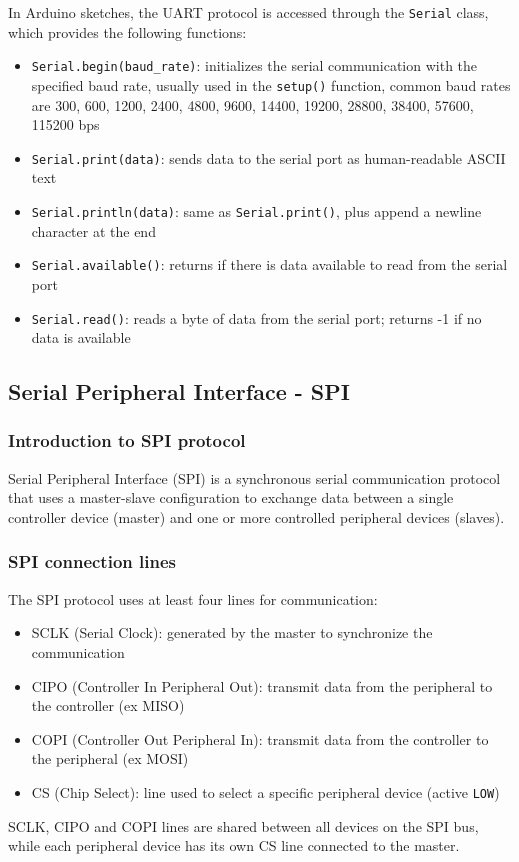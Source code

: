 In Arduino sketches, the UART protocol is accessed through the \texttt{Serial} class, which provides the following functions:
\begin{itemize}
	\item \texttt{Serial.begin(baud\_rate)}: initializes the serial communication with the specified baud rate, usually used
	in the \texttt{setup()} function, common baud rates are 300, 600, 1200, 2400, 4800, 9600, 14400, 19200, 28800, 38400, 57600,
	115200 bps 
	\item \texttt{Serial.print(data)}: sends data to the serial port as human-readable ASCII text
	\item \texttt{Serial.println(data)}: same as \texttt{Serial.print()}, plus append a newline character at the end
	\item \texttt{Serial.available()}: returns if there is data available to read from the serial port
	\item \texttt{Serial.read()}: reads a byte of data from the serial port; returns -1 if no data is available
\end{itemize}

\newpage

\subsection{Serial Peripheral Interface - SPI}
\subsubsection*{Introduction to SPI protocol}
Serial Peripheral Interface (SPI) is a synchronous serial communication protocol that uses a master-slave configuration
to exchange data between a single controller device (master) and one or more controlled peripheral devices (slaves).

\subsubsection*{SPI connection lines}
The SPI protocol uses at least four lines for communication:
\begin{itemize}
	\item SCLK (Serial Clock): generated by the master to synchronize the communication
	\item CIPO (Controller In Peripheral Out): transmit data from the peripheral to the controller (ex MISO)
	\item COPI (Controller Out Peripheral In): transmit data from the controller to the peripheral (ex MOSI)
	\item CS (Chip Select): line used to select a specific peripheral device (active \texttt{LOW})
\end{itemize}
SCLK, CIPO and COPI lines are shared between all devices on the SPI bus, while each peripheral device has its own CS line
connected to the master.

